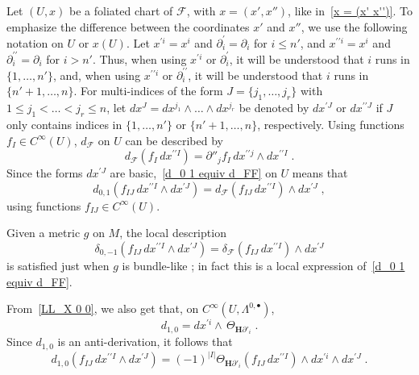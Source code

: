 \documentclass{memo-l}
\theoremstyle{plain}
\theoremstyle{definition}
\theoremstyle{remark}
\newcommand{\FF}{\mathcal{F}}
\newcommand{\bfH}{\boldsymbol{H}}
\numberwithin{section}{chapter}
\numberwithin{equation}{section}%
\begin{document}
Let $(U,x)$ be a foliated chart of $\FF$, with $x=(x',x'')$, like in~\eqref{x = (x' x'')}. To emphasize the difference between the coordinates $x'$ and $x''$, we use the following notation on $U$ or $x(U)$. Let $x^{\prime i}=x^i$ and $\partial_i^{\prime}=\partial_i$ for $i\le n'$, and $x^{\prime\prime i}=x^i$ and $\partial_i^{\prime\prime}=\partial_i$ for $i>n'$. Thus, when using $x^{\prime i}$ or $\partial_i^{\prime}$, it will be understood that $i$ runs in $\{1,\dots,n'\}$, and, when using $x^{\prime\prime i}$ or $\partial_i^{\prime\prime}$, it will be understood that $i$ runs in $\{n'+1,\dots,n\}$. For multi-indices of the form $J=\{j_1,\dots,j_r\}$ with $1\le j_1<\dots<j_r\le n$, let $dx^J=dx^{j_1}\wedge\dots\wedge dx^{j_r}$ be denoted by $dx^{\prime J}$ or $dx^{\prime\prime J}$ if $J$ only contains indices in $\{1,\dots,n'\}$ or $\{n'+1,\dots,n\}$, respectively. Using functions $f_I\in C^\infty(U)$, $d_\FF$ on $U$ can be described by
\begin{equation}\label{d_FF(f_I dx^prime prime I)}
d_\FF(f_I\,dx^{\prime\prime I})=\partial''_jf_I\,dx^{\prime\prime j}\wedge dx^{\prime\prime I}\;.
\end{equation}
Since the forms $dx^{\prime J}$ are basic,~\eqref{d_0 1 equiv d_FF} on $U$ means that
\begin{equation}\label{d_0 1(f_IJ dx''^I wedge dx'^J)}
d_{0,1}(f_{IJ}\,dx^{\prime\prime I}\wedge dx^{\prime J})=d_\FF(f_{IJ}\,dx^{\prime\prime I})\wedge dx^{\prime J}\;,
\end{equation}
using functions $f_{IJ}\in C^\infty(U)$.

Given a metric $g$ on $M$, the local description
\begin{equation}\label{delta_0 -1(f_IJ dx''^I wedge dx'^J)}
\delta_{0,-1}(f_{IJ}\,dx^{\prime\prime I}\wedge dx^{\prime J})=\delta_\FF(f_{IJ}\,dx^{\prime\prime I})\wedge dx^{\prime J}
\end{equation}
is satisfied just when $g$ is bundle-like \cite[Lemma~3.4]{AlvKordy2001}; in fact this is a local expression of~\eqref{d_0 1 equiv d_FF}.

From~\eqref{LL_X 0 0}, we also get that, on $C^\infty(U,\Lambda^{0,{\bullet}})$,
\begin{equation}\label{d_1,0 = dx^prime i wedge Theta_bfH partial'_i}
d_{1,0}={dx^{\prime i}\wedge}\,\Theta_{\bfH\partial'_i}\;.
\end{equation}
Since $d_{1,0}$ is an anti-derivation, it follows that
\begin{equation}\label{d_1 0(f_IJ dx''^I wedge dx'^J)}
d_{1,0}(f_{IJ}\,dx^{\prime\prime I}\wedge dx^{\prime J})=(-1)^{|I|}\Theta_{\bfH\partial'_i}(f_{IJ}\,dx^{\prime\prime I})\wedge dx^{\prime i}\wedge dx^{\prime J}\;.
\end{equation}
\end{document}
